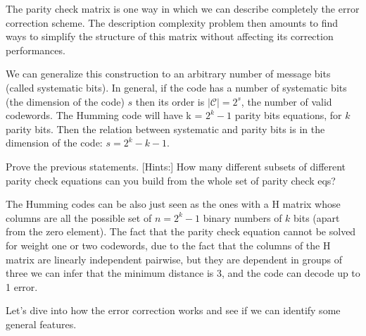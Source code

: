 The parity check matrix is one way in which we can describe completely the error correction scheme. The description complexity problem then amounts to find ways to simplify the structure of this matrix without affecting its correction performances.


We can generalize this construction to an arbitrary number of message bits (called systematic bits). In general, if the code has a number of systematic bits (the dimension of the code) $s$ then its order is $|\mathcal{C}| = 2^{s}$, the number of valid codewords. The Humming code will have k = $ 2^k -1 $ parity bits equations, for $k$ parity bits. Then the relation between systematic and parity bits is in the dimension of the code: $s = 2^{k} - k - 1$.

\begin{example}
	Prove the previous statements.
	[Hints:] How many different subsets of different parity check equations can you build from the whole set of parity check eqs?
\end{example}

The Humming codes can be also just seen as the ones with a H matrix whose columns are all the possible set of $n = 2^k-1$ binary numbers of $k$ bits (apart from the zero element). The fact that the parity check equation cannot be solved for weight one or two codewords, due to the fact that the columns of the H matrix are linearly independent pairwise, but they are dependent in groups of three we can infer that the minimum distance is 3, and the code can decode up to 1 error.


Let's dive into how the error correction works and see if we can identify some general features.

